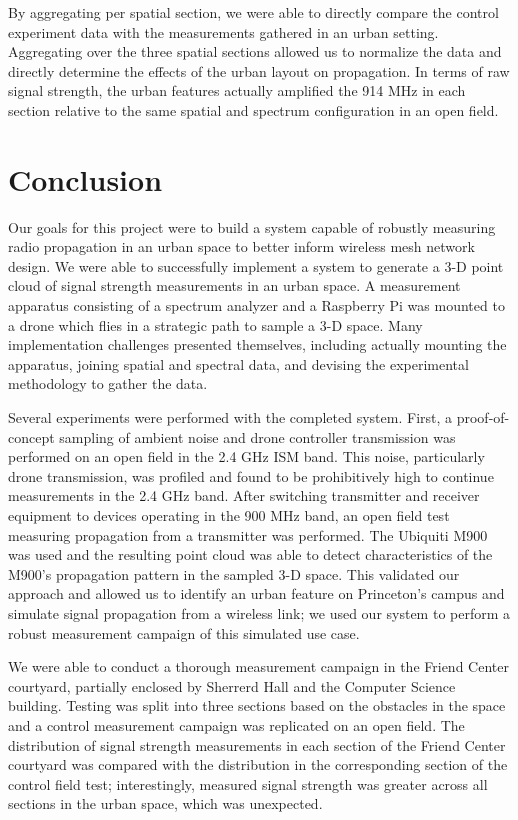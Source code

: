 \documentclass[pageno]{jpaper}
\begin{document}
By aggregating per spatial section, we were able to directly compare the control experiment data with the measurements gathered in an urban setting. Aggregating over the three spatial sections allowed us to normalize the data and directly determine the effects of the urban layout on propagation. In terms of raw signal strength, the urban features actually amplified the 914 MHz in each section relative to the same spatial and spectrum configuration in an open field.
	
\section{Conclusion}
Our goals for this project were to build a system capable of robustly measuring radio propagation in an urban space to better inform wireless mesh network design. We were able to successfully implement a system to generate a 3-D point cloud of signal strength measurements in an urban space. A measurement apparatus consisting of a spectrum analyzer and a Raspberry Pi was mounted to a drone which flies in a strategic path to sample a 3-D space. Many implementation challenges presented themselves, including actually mounting the apparatus, joining spatial and spectral data, and devising the experimental methodology to gather the data. 

Several experiments were performed with the completed system. First, a proof-of-concept sampling of ambient noise and drone controller transmission was performed on an open field in the 2.4 GHz ISM band. This noise, particularly drone transmission, was profiled and found to be prohibitively high to continue measurements in the 2.4 GHz band. After switching transmitter and receiver equipment to devices operating in the 900 MHz band, an open field test measuring propagation from a transmitter was performed. The Ubiquiti M900 was used and the resulting point cloud was able to detect characteristics of the M900's propagation pattern in the sampled 3-D space. This validated our approach and allowed us to identify an urban feature on Princeton's campus and simulate signal propagation from a wireless link; we used our system to perform a robust measurement campaign of this simulated use case.

We were able to conduct a thorough measurement campaign in the Friend Center courtyard, partially enclosed by Sherrerd Hall and the Computer Science building. Testing was split into three sections based on the obstacles in the space and a control measurement campaign was replicated on an open field. The distribution of signal strength measurements in each section of the Friend Center courtyard was compared with the distribution in the corresponding section of the control field test; interestingly,  measured signal strength was greater across all sections in the urban space, which was unexpected. 
\end{document}
